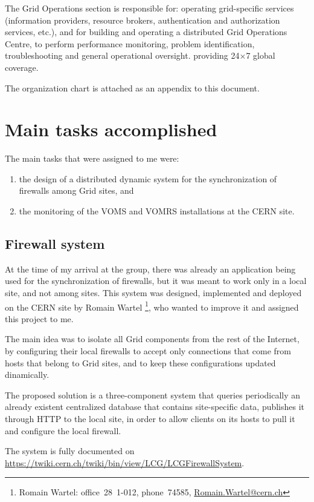 \documentclass[12pt]{article}
\begin{document}
    The Grid Operations section is responsible for: operating grid-specific
    services (information providers, resource brokers, authentication and
    authorization services, etc.), and for building and operating a distributed
    Grid Operations Centre, to perform performance monitoring, problem
    identification, troubleshooting and general operational oversight.
    providing 24$\times$7 global coverage.

    The organization chart is attached as an appendix to this document.

  \section{Main tasks accomplished}
    The main tasks that were assigned to me were:
    \begin{enumerate}
        \item the design of a distributed dynamic system for the
            synchronization of firewalls among Grid sites, and
        \item the monitoring of the VOMS and VOMRS installations at the CERN
            site.
    \end{enumerate}

    \subsection{Firewall system}
    At the time of my arrival at the group, there was already an application
    being used for the synchronization of firewalls, but it was meant to
    work only in a local site, and not among sites.  This system was designed,
    implemented and deployed on the CERN site by Romain Wartel%
    \footnote{Romain Wartel: office~28~1-012, phone~74585, \url{Romain.Wartel@cern.ch}},
    who wanted to improve it and assigned this project to me.

    The main idea was to isolate all Grid components from the rest of the
    Internet, by configuring their local firewalls to accept only connections
    that come from hosts that belong to Grid sites, and to keep these
    configurations updated dinamically.

    The proposed solution is a three-component system that queries periodically
    an already existent centralized database that contains site-specific data,
    publishes it through HTTP to the local site, in order to allow clients on
    its hosts to pull it and configure the local firewall.

    The system is fully documented on
    \url{https://twiki.cern.ch/twiki/bin/view/LCG/LCGFirewallSystem}.
    
\end{document}
